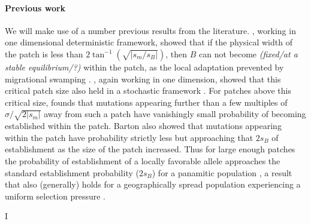 \documentclass{article}
\newcommand{\gc}[1]{{\it\color{green}(#1)} }
\begin{document}
\paragraph{Previous work} We will make use of a number previous
results from the literature. \citet{slatkin1973geneflow}, working in
one dimensional deterministic framework, showed that if the
physical width of the patch is less than $2 \tan^{-1}
(\sqrt{|s_m/s_B|})$, then $B$ can not 
become \gc{fixed/at a stable equilibrium/?} within the patch, as the local adaptation prevented by
migrational swamping \citep[see also][ for a review]{Lenormand}.
 \citet{barton1987establishment}, again working in one dimension,
 showed that this critical patch size also held in a stochastic
 framework \citep[see also the work of][]{Polk}. 
For patches above this critical size, \citet{barton1987establishment}
 founds that mutations appearing further than a few multiples of
 $\sigma/\sqrt{2|s_m|}$ away from such a patch have vanishingly small
 probability of becoming established within the patch. 
Barton also showed that mutations appearing within the patch have probability 
strictly less but approaching that $2s_B$ of establishment as the size
of the patch increased. Thus for large enough patches the probability
of establishment of a locally favorable allele approaches the standard
establishment probability ($2s_B$) for a panamitic population
\citep[][]{haldane, fisher}, a result that also (generally) holds for
a geographically spread population experiencing a uniform selection
pressure \citep{Maruyama, cherry}. 




I%
\end{document}
